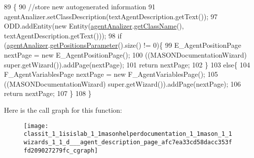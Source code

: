 \begin{DoxyCode}
89                                     \{ 
90         \textcolor{comment}{//store new autogenerated information}
91         agentAnalizer.setClassDescription(textAgentDescription.getText());
97         ODD.addEntity(\textcolor{keyword}{new} Entity(\hyperlink{classit_1_1isislab_1_1masonhelperdocumentation_1_1mason_1_1wizards_1_1_d___agent_description_page_a2a9e05cc43fedb16d75050620d30f712}{agentAnalizer}.\hyperlink{classit_1_1isislab_1_1masonhelperdocumentation_1_1analizer_1_1_agent_analizer_ace466e16439878a851eb63d5a11ddf43}{getClassName}(), 
      textAgentDescription.getText()));   
98         \textcolor{keywordflow}{if} (\hyperlink{classit_1_1isislab_1_1masonhelperdocumentation_1_1mason_1_1wizards_1_1_d___agent_description_page_a2a9e05cc43fedb16d75050620d30f712}{agentAnalizer}.\hyperlink{classit_1_1isislab_1_1masonhelperdocumentation_1_1analizer_1_1_agent_analizer_aa2e85956f4a23176c398294cf02d859d}{getPositionsParameter}().size() != 0)\{
99             E\_AgentPositionPage nextPage = \textcolor{keyword}{new} E\_AgentPositionPage();
100             ((MASONDocumentationWizard) super.getWizard()).addPage(nextPage); 
101             \textcolor{keywordflow}{return} nextPage; 
102         \}
103         \textcolor{keywordflow}{else}\{
104             F\_AgentVariablesPage nextPage = \textcolor{keyword}{new} F\_AgentVariablesPage();
105             ((MASONDocumentationWizard) super.getWizard()).addPage(nextPage);
106             \textcolor{keywordflow}{return} nextPage;
107         \}
108     \}
\end{DoxyCode}


Here is the call graph for this function\-:
\nopagebreak
\begin{figure}[H]
\begin{center}
\leavevmode
\texttt{[image: classit\_1\_1isislab\_1\_1masonhelperdocumentation\_1\_1mason\_1\_1wizards\_1\_1\_d\_\_\_agent\_description\_page\_afc7ea33cd58dacc353ffd209027279fc\_cgraph]}
\end{center}
\end{figure}


